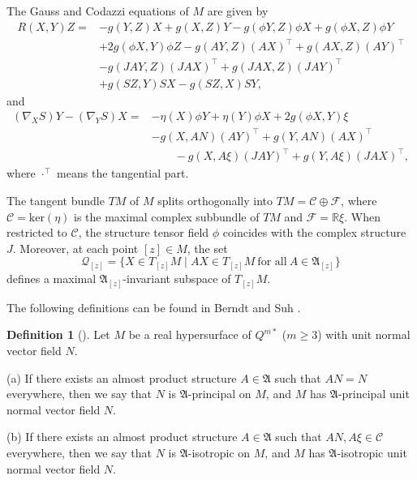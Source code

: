 \documentclass[reqno]{amsart}%
\theoremstyle{definition}
\newtheorem{definition}[theorem]{Definition}
\numberwithin{equation}{section}
\begin{document}
The Gauss and Codazzi equations of $M$ are given by
%
\begin{equation}\label{eqn:2.8}
\begin{split}
R(X,Y)Z=&-g(Y,Z)X+g(X,Z)Y-g(\phi Y,Z)\phi X+g(\phi X,Z)\phi Y\\
 &+2g(\phi X,Y)\phi Z-g(AY,Z)(AX)^\top+g(AX,Z)(AY)^\top\\
 &-g(JAY,Z)(JAX)^\top+g(JAX,Z)(JAY)^\top\\
 &+g(SZ,Y)SX-g(SZ,X)SY,
 \end{split}
\end{equation}
and
\begin{equation}\label{eqn:2.9}
\begin{split}
(\nabla_X S)Y-(\nabla_Y S)X=&-\eta(X)\phi Y+\eta(Y)\phi X+2g(\phi X,Y)\xi\\
&-g(X,AN)(AY)^\top+g(Y,AN)(AX)^\top\\
 &\qquad -g(X,A\xi)(JAY)^\top +g(Y,A\xi)(JAX)^\top,
\end{split}
\end{equation}
where $\cdot^\top$ means the tangential part.

%

The tangent bundle $TM$ of $M$ splits orthogonally into
$TM=\mathcal{C}\oplus \mathcal{F}$, where $\mathcal{C}=\text{ker}(\eta)$
is the maximal complex subbundle of $TM$ and $\mathcal{F}=\mathbb{R}\xi$.
When restricted to $\mathcal{C}$, the structure tensor field $\phi$
coincides with the complex structure $J$. Moreover, at each point
$[z]\in M$, the set
%
$$
\mathcal{Q}_{[z]}=\{X\in T_{[z]}M\mid AX\in T_{[z]}M\ \text{for all}\ A\in \mathfrak{A}_{[z]}\}
$$
defines a maximal $\mathfrak{A}_{[z]}$-invariant subspace of $T_{[z]}M$.

The following definitions can be found in Berndt and Suh \cite{BS-2022,Suh4}.

\begin{definition}[\cite{BS-2022,Suh4}]\label{def:2.1}
Let $M$ be a real hypersurface of $Q^{m*}$ ($m\geq3$) with unit normal vector field $N$.

{\rm (a)} If there exists an almost product structure $A\in \mathfrak{A}$
such that $AN=N$ everywhere, then we say that $N$ is $\mathfrak{A}$-principal on $M$,
and $M$ has $\mathfrak{A}$-principal unit normal vector field $N$.

{\rm (b)} If there exists an almost product structure $A\in\mathfrak{A}$
such that $AN,A\xi\in \mathcal{C}$ everywhere, then we say that
$N$ is $\mathfrak{A}$-isotropic on $M$, and $M$ has $\mathfrak{A}$-isotropic unit normal vector field $N$.
\end{definition}
\end{document}
